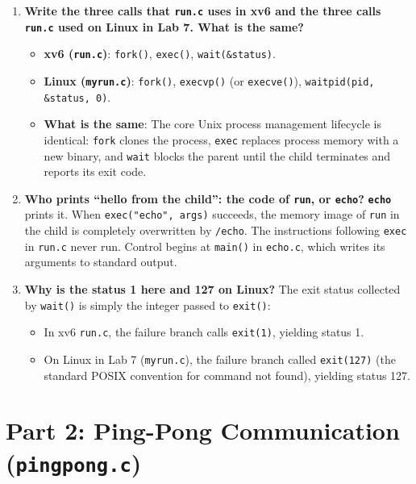 \documentclass[12pt,a4paper]{article}
\begin{document}
\begin{enumerate}
    \item \textbf{Write the three calls that \texttt{run.c} uses in xv6 and the three calls \texttt{run.c} used on Linux in Lab 7. What is the same?}
    \begin{itemize}
        \item \textbf{xv6 (\texttt{run.c})}: \texttt{fork()}, \texttt{exec()}, \texttt{wait(\&status)}.
        \item \textbf{Linux (\texttt{myrun.c})}: \texttt{fork()}, \texttt{execvp()} (or \texttt{execve()}), \texttt{waitpid(pid, \&status, 0)}.
        \item \textbf{What is the same}: The core Unix process management lifecycle is identical: \texttt{fork} clones the process, \texttt{exec} replaces process memory with a new binary, and \texttt{wait} blocks the parent until the child terminates and reports its exit code.
    \end{itemize}

    \item \textbf{Who prints ``hello from the child'': the code of \texttt{run}, or \texttt{echo}?}
    \textbf{\texttt{echo}} prints it.  
    When \texttt{exec("echo", args)} succeeds, the memory image of \texttt{run} in the child is completely overwritten by \texttt{/echo}. The instructions following \texttt{exec} in \texttt{run.c} never run. Control begins at \texttt{main()} in \texttt{echo.c}, which writes its arguments to standard output.

    \item \textbf{Why is the status 1 here and 127 on Linux?}
    The exit status collected by \texttt{wait()} is simply the integer passed to \texttt{exit()}:
    \begin{itemize}
        \item In xv6 \texttt{run.c}, the failure branch calls \texttt{exit(1)}, yielding status 1.
        \item On Linux in Lab 7 (\texttt{myrun.c}), the failure branch called \texttt{exit(127)} (the standard POSIX convention for command not found), yielding status 127.
    \end{itemize}
\end{enumerate}

\newpage

\section{Part 2: Ping-Pong Communication (\texttt{pingpong.c})}
\end{document}
